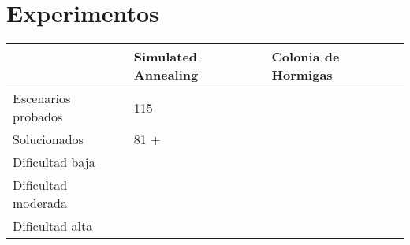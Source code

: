 \section{Experimentos}

\begin{table}
\centering
\begin{tabular}{|l|l|l|}
\hline
          & \textbf{Simulated Annealing} & \textbf{Colonia de Hormigas} \\ \hline
{Escenarios probados} &       115                       &                              \\ \hline
{Solucionados} &                      81  +      &                              \\ \hline
{Dificultad baja} &                              &                              \\ \hline
{Dificultad moderada} &                              &                              \\ \hline
{Dificultad alta} &                              &                              \\ \hline
\end{tabular}
\end{table}